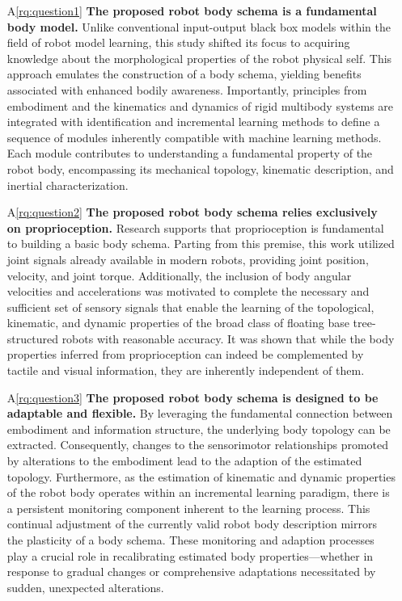 \documentclass[12pt, a4paper]{article}
\begin{document}
\begin{itemize}
	\item[A\ref{rq:question1}] \textbf{The proposed robot body schema is a fundamental body model.} Unlike conventional input-output black box models within the field of robot model learning, this study shifted its focus to acquiring knowledge about the morphological properties of the robot physical self. This approach emulates the construction of a body schema, yielding benefits associated with enhanced bodily awareness. Importantly, principles from embodiment and the kinematics and dynamics of rigid multibody systems are integrated with identification and incremental learning methods to define a sequence of modules inherently compatible with machine learning methods. Each module contributes to understanding a fundamental property of the robot body, encompassing its mechanical topology, kinematic description, and inertial characterization. 
	
	\item[A\ref{rq:question2}] \textbf{The proposed robot body schema relies exclusively on proprioception.} Research supports that proprioception is fundamental to building a basic body schema. Parting from this premise, this work utilized joint signals already available in modern robots, providing joint position, velocity, and joint torque. Additionally, the inclusion of body angular velocities and accelerations was motivated to complete the necessary and sufficient set of sensory signals that enable the learning of the topological, kinematic, and dynamic properties of the broad class of floating base tree-structured robots with reasonable accuracy. It was shown that while the body properties inferred from proprioception can indeed be complemented by tactile and visual information, they are inherently independent of them.
		
	\item[A\ref{rq:question3}] \textbf{The proposed robot body schema is designed to be adaptable and flexible.} By leveraging the fundamental connection between embodiment and information structure, the underlying body topology can be extracted. Consequently, changes to the sensorimotor relationships promoted by alterations to the embodiment lead to the adaption of the estimated topology. Furthermore, as the estimation of kinematic and dynamic properties of the robot body operates within an incremental learning paradigm, there is a persistent monitoring component inherent to the learning process. This continual adjustment of the currently valid robot body description mirrors the plasticity of a body schema. These monitoring and adaption processes play a crucial role in recalibrating estimated body properties—whether in response to gradual changes or comprehensive adaptations necessitated by sudden, unexpected alterations.

\end{itemize}
\end{document}
